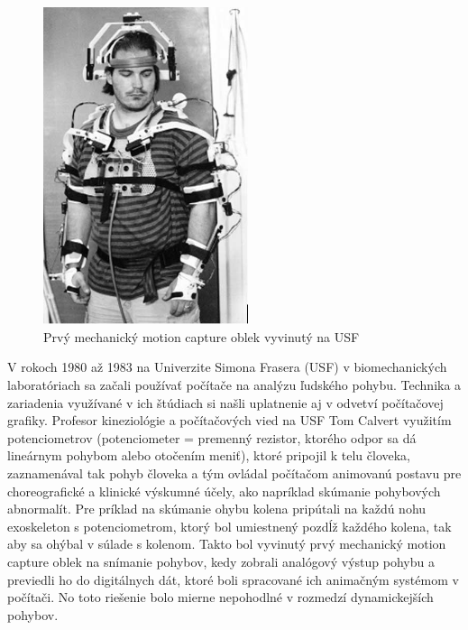\begin{figure}[!htbp]
  \centering
  \includegraphics[width=6cm]{img/firstMechMocapSuit.jpg}
  \caption{Prvý mechanický motion capture oblek vyvinutý na USF}
  \label{mechMocapFig}
\end{figure}

V rokoch 1980 až 1983 na Univerzite Simona Frasera (USF) v biomechanických laboratóriach sa začali používať počítače na analýzu ľudského pohybu. Technika a zariadenia využívané v ich štúdiach si našli uplatnenie aj v odvetví počítačovej grafiky. Profesor kineziológie a počítačových vied na USF Tom Calvert využitím potenciometrov (potenciometer = premenný rezistor, ktorého odpor sa dá lineárnym pohybom alebo otočením meniť), ktoré pripojil k telu človeka, zaznamenával tak pohyb človeka a tým ovládal počítačom animovanú postavu pre choreografické a klinické výskumné účely, ako napríklad skúmanie pohybových abnormalít. Pre príklad na skúmanie ohybu kolena pripútali na každú nohu exoskeleton s potenciometrom, ktorý bol umiestnený pozdĺž každého kolena, tak aby sa ohýbal v súlade s kolenom. Takto bol vyvinutý prvý mechanický motion capture oblek na snímanie pohybov, kedy zobrali analógový výstup pohybu a previedli ho do digitálnych dát, ktoré boli spracované ich animačným systémom v počítači. No toto riešenie bolo mierne nepohodlné v rozmedzí dynamickejších pohybov.

